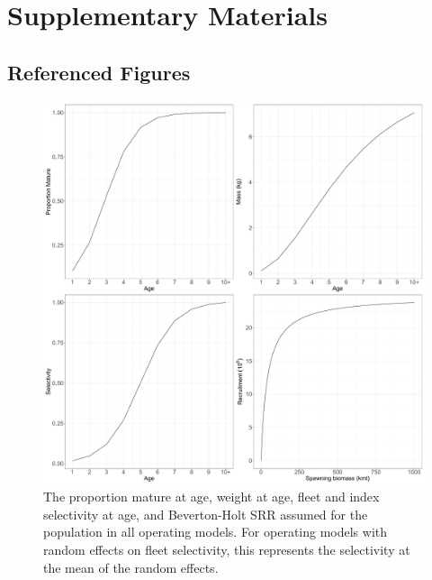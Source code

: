 \documentclass[
  12pt,
]{article}
\begin{document}
\begin{landscape}
\end{landscape}
\pagebreak

\setcounter{figure}{0}
\renewcommand\thefigure{S\arabic{figure}}

\setcounter{table}{0}
\renewcommand\thetable{S\arabic{table}}

\pagebreak

\section*{Supplementary Materials}\label{supplementary-materials}

\pagebreak

\subsection*{Referenced Figures}\label{referenced-figures}

\begin{figure}[!ht]
\begin{center}
\includegraphics[width = \textwidth]{om_input_plots_figure}
\end{center}
\caption{The proportion mature at age, weight at age, fleet and index selectivity at age, and Beverton-Holt SRR assumed for the population in all operating models. For operating models with random effects on fleet selectivity, this represents the selectivity at the mean of the random effects.}\label{om_inputs_fig}
\end{figure}
\end{document}
